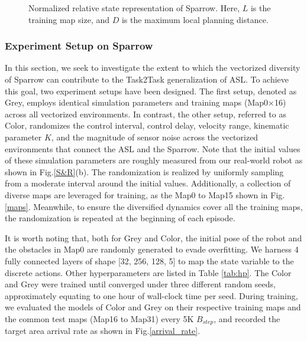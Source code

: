 \documentclass[journal]{IEEEtran}
\begin{document}
\begin{figure}[t]
	\centering
	\hfil
	\caption{Normalized relative state representation of Sparrow. Here, $L$ is the training map size, and $D$ is the maximum local planning distance.}
	\label{s_r}
\end{figure}

\subsubsection{Experiment Setup on Sparrow}
In this section, we seek to investigate the extent to which the vectorized diversity of Sparrow can contribute to the Task2Task generalization of ASL. To achieve this goal, two experiment setups have been designed. The first setup, denoted as Grey, employs identical simulation parameters and training maps (Map0$\times$16) across all vectorized environments. In contrast, the other setup, referred to as Color, randomizes the control interval, control delay, velocity range, kinematic parameter $K$, and the magnitude of sensor noise across the vectorized environments that connect the ASL and the Sparrow. Note that the initial values of these simulation parameters are roughly measured from our real-world robot as shown in Fig.\ref{S&R}(b). The randomization is realized by uniformly sampling from a moderate interval around the initial values. Additionally, a collection of diverse maps are leveraged for training, as the Map0 to Map15 shown in Fig.\ref{maps}. Meanwhile, to ensure the diversified dynamics cover all the training maps, the randomization is repeated at the beginning of each episode. 

It is worth noting that, both for Grey and Color, the initial pose of the robot and the obstacles in Map0 are randomly generated to evade overfitting. We harness 4 fully connected layers of shape [32, 256, 128, 5] to map the state variable to the discrete actions. Other hyperparameters are listed in Table \ref{tab:hp}. The Color and Grey were trained until converged under three different random seeds, approximately equating to one hour of wall-clock time per seed. During training, we evaluated the models of Color and Grey on their respective training maps and the common test maps (Map16 to Map31) every 5K $B_{step}$, and recorded the target area arrival rate as shown in Fig.\ref{arrival_rate}.
\end{document}
